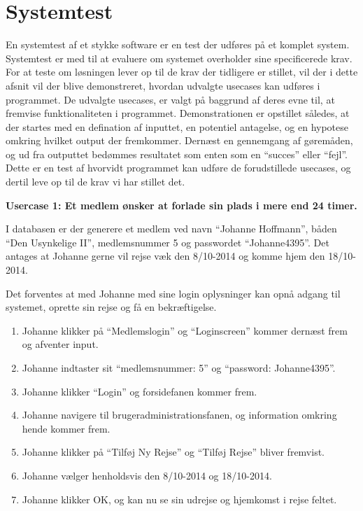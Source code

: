 \section{Systemtest}
En systemtest af et stykke software er en test der udføres på et komplet system. Systemtest er med til at evaluere om systemet overholder sine specificerede krav. For at teste om løsningen lever op til de krav der tidligere er stillet, vil der i dette afsnit vil der blive demonstreret, hvordan udvalgte usecases kan udføres i programmet. De udvalgte usecases, er valgt på baggrund af deres evne til, at fremvise funktionaliteten i programmet. Demonstrationen er opstillet således, at der startes med en defination af inputtet, en potentiel antagelse, og en hypotese omkring hvilket output der fremkommer. Dernæst en gennemgang af gøremåden, og ud fra outputtet bedømmes resultatet som enten som en \enquote{succes} eller \enquote{fejl}. Dette er en test af hvorvidt programmet kan udføre de forudstillede usecases, og dertil leve op til de krav vi har stillet det.

\textbf{Usercase 1: Et medlem ønsker at forlade sin plads i mere end 24 timer.}

I databasen er der generere et medlem ved navn \enquote{Johanne Hoffmann}, båden \enquote{Den Usynkelige II}, medlemsnummer 5 og passwordet \enquote{Johanne4395}. Det antages at Johanne gerne vil rejse væk den 8/10-2014 og komme hjem den 18/10-2014.

Det forventes at med Johanne med sine login oplysninger kan opnå adgang til systemet, oprette sin rejse og få en bekræftigelse.

\begin{enumerate}
	\item Johanne klikker på \enquote{Medlemslogin} og \enquote{Loginscreen} kommer dernæst frem og afventer input.
	\item Johanne indtaster sit \enquote{medlemsnummer: 5} og \enquote{password: Johanne4395}.
	\item Johanne klikker \enquote{Login} og forsidefanen kommer frem.
	\item Johanne navigere til brugeradministrationsfanen, og information omkring hende kommer frem.
	\item Johanne klikker på \enquote{Tilføj Ny Rejse} og \enquote{Tilføj Rejse} bliver fremvist.
	\item Johanne vælger henholdsvis den 8/10-2014 og 18/10-2014.
	\item Johanne klikker OK, og kan nu se sin udrejse og hjemkomst i rejse feltet.
\end{enumerate}

